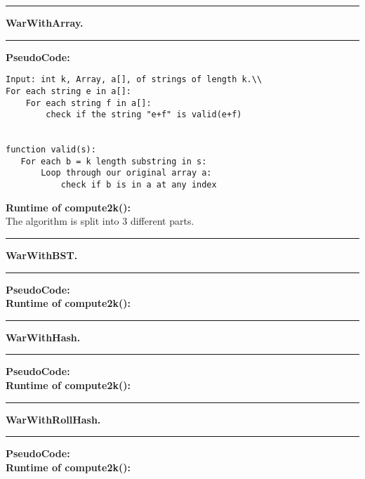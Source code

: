 \documentclass[11pt]{article}
\newcommand\question[2]{\vspace{.25in}\hrule\textbf{#1. #2}\vspace{.5em}\hrule\vspace{.10in}}
\begin{document}
\raggedright
\newcommand\NAME{Devin Johnson, Mason Wray}  %
\newcommand\HWNUM{ PA1}              %



\question{WarWithArray}{} 

\textbf{PseudoCode:}\\
\begin{verbatim}
Input: int k, Array, a[], of strings of length k.\\
For each string e in a[]:
    For each string f in a[]:
        check if the string "e+f" is valid(e+f)
    	
    	
function valid(s):
   For each b = k length substring in s:
       Loop through our original array a:
           check if b is in a at any index
\end{verbatim}

\textbf{Runtime of compute2k():}\\

The algorithm is split into 3 different parts.  

\pagebreak
\question{WarWithBST}{}

\textbf{PseudoCode:}\\

\textbf{Runtime of compute2k():}\\

\pagebreak
\question{WarWithHash}{}

\textbf{PseudoCode:}\\

\textbf{Runtime of compute2k():}\\


\pagebreak
\question{WarWithRollHash}{}

\textbf{PseudoCode:}\\

\textbf{Runtime of compute2k():}\\
\end{document}
